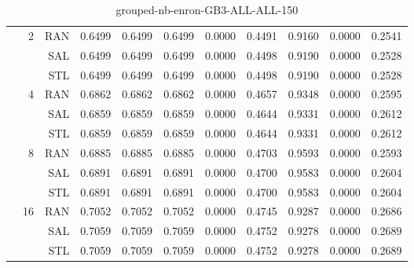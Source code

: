 \begin{center}
\begin{table}[htbp]
\begin{center}
\begin{tabular}{ | r | r | r | r | r | r | r | r | r | r | r |}
 & \multirow{3}{*}{2} & RAN & 0.6499 & 0.6499 & 0.6499 & 0.0000 & 0.4491 & 0.9160 & 0.0000 & 0.2541\\ \cline{3-11}
 &   & SAL & 0.6499 & 0.6499 & 0.6499 & 0.0000 & 0.4498 & 0.9190 & 0.0000 & 0.2528\\ \cline{3-11}
 &   & STL & 0.6499 & 0.6499 & 0.6499 & 0.0000 & 0.4498 & 0.9190 & 0.0000 & 0.2528\\ \cline{2-11}
 & \multirow{3}{*}{4} & RAN & 0.6862 & 0.6862 & 0.6862 & 0.0000 & 0.4657 & 0.9348 & 0.0000 & 0.2595\\ \cline{3-11}
 &   & SAL & 0.6859 & 0.6859 & 0.6859 & 0.0000 & 0.4644 & 0.9331 & 0.0000 & 0.2612\\ \cline{3-11}
 &   & STL & 0.6859 & 0.6859 & 0.6859 & 0.0000 & 0.4644 & 0.9331 & 0.0000 & 0.2612\\ \cline{2-11}
 & \multirow{3}{*}{8} & RAN & 0.6885 & 0.6885 & 0.6885 & 0.0000 & 0.4703 & 0.9593 & 0.0000 & 0.2593\\ \cline{3-11}
 &   & SAL & 0.6891 & 0.6891 & 0.6891 & 0.0000 & 0.4700 & 0.9583 & 0.0000 & 0.2604\\ \cline{3-11}
 &   & STL & 0.6891 & 0.6891 & 0.6891 & 0.0000 & 0.4700 & 0.9583 & 0.0000 & 0.2604\\ \cline{2-11}
 & \multirow{3}{*}{16} & RAN & 0.7052 & 0.7052 & 0.7052 & 0.0000 & 0.4745 & 0.9287 & 0.0000 & 0.2686\\ \cline{3-11}
 &   & SAL & 0.7059 & 0.7059 & 0.7059 & 0.0000 & 0.4752 & 0.9278 & 0.0000 & 0.2689\\ \cline{3-11}
 &   & STL & 0.7059 & 0.7059 & 0.7059 & 0.0000 & 0.4752 & 0.9278 & 0.0000 & 0.2689\\ \cline{2-11}
\hline
\end{tabular}
\caption{grouped-nb-enron-GB3-ALL-ALL-150}
\end{center}
 \end{table}
\end{center}

